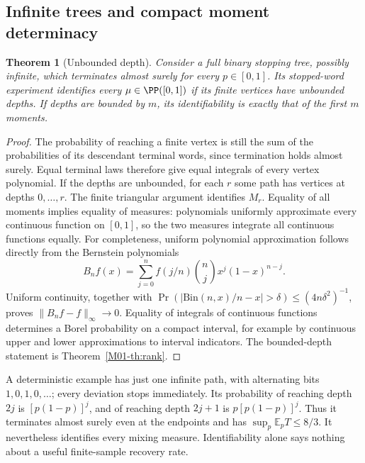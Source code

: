 \documentclass[11pt,a4paper]{article}
\newtheorem{theorem}{Theorem}[section]
\theoremstyle{definition}\newtheorem{definition}[theorem]{Definition}
\theoremstyle{remark}\newtheorem{remark}[theorem]{Remark}
\newcommand{\E}{\mathbb E}\newcommand{\one}{\mathbf 1}\newcommand{\1}{\mathbf 1}
\numberwithin{equation}{section}
\begin{document}
\subsection{Infinite trees and compact moment determinacy}\label{M01-sec-4}
\begin{theorem}[Unbounded depth]
Consider a full binary stopping tree, possibly infinite, which terminates almost surely for every $p\in[0,1]$. Its stopped-word experiment identifies every $\mu\in\PP([0,1])$ if its finite vertices have unbounded depths. If depths are bounded by $m$, its identifiability is exactly that of the first $m$ moments.
\end{theorem}
\begin{proof}
The probability of reaching a finite vertex is still the sum of the probabilities of its descendant terminal words, since termination holds almost surely. Equal terminal laws therefore give equal integrals of every vertex polynomial. If the depths are unbounded, for each $r$ some path has vertices at depths $0,\ldots,r$. The finite triangular argument identifies $M_r$. Equality of all moments implies equality of measures: polynomials uniformly approximate every continuous function on $[0,1]$, so the two measures integrate all continuous functions equally. For completeness, uniform polynomial approximation follows directly from the Bernstein polynomials
\[
 B_nf(x)=\sum_{j=0}^n f(j/n)\binom{n}{j}x^j(1-x)^{n-j}.
\]
Uniform continuity, together with $\Pr(|\mathrm{Bin}(n,x)/n-x|>\delta)\le(4n\delta^2)^{-1}$, proves $\|B_nf-f\|_\infty\to0$. Equality of integrals of continuous functions determines a Borel probability on a compact interval, for example by continuous upper and lower approximations to interval indicators. The bounded-depth statement is Theorem~\ref{M01-th:rank}.
\end{proof}
A deterministic example has just one infinite path, with alternating bits $1,0,1,0,\ldots$; every deviation stops immediately. Its probability of reaching depth $2j$ is $[p(1-p)]^j$, and of reaching depth $2j+1$ is $p[p(1-p)]^j$. Thus it terminates almost surely even at the endpoints and has $\sup_p\E_pT\le8/3$. It nevertheless identifies every mixing measure. Identifiability alone says nothing about a useful finite-sample recovery rate.
\end{document}

